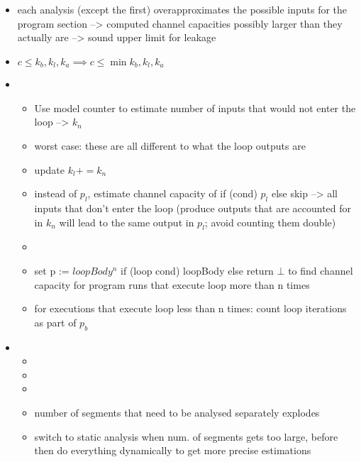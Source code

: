 \begin{itemize}
    \item each analysis (except the first) overapproximates the possible inputs for the program section --> computed channel capacities possibly larger than they actually are --> sound upper limit for leakage
    \item $c \leq k_b, k_l, k_a \implies c \leq \min{k_b, k_l, k_a}$
    \item {}
    \begin{itemize}
        \item Use model counter to estimate number of inputs that would not enter the loop --> $k_n$
        \item worst case: these are all different to what the loop outputs are
        \item update $k_l += k_n$
        \item instead of $p_l$, estimate channel capacity of if (cond) $p_l$ else skip --> all inputs that don't enter the loop (produce outputs that are accounted for in $k_n$ will lead to the same output in $p_l$; avoid counting them double)
        \item {}
        \item set p := $loopBody^n$ if (loop cond) loopBody else return $\bot$ to find channel capacity for program runs that execute loop more than n times
        \item for executions that execute loop less than n times: count loop iterations as part of $p_b$
    \end{itemize}
    \item {}
        \begin{itemize}
        \item {}
        \item {}
        \item {}
        \item number of segments that need to be analysed separately explodes
        \item switch to static analysis when num. of segments gets too large, before then do everything dynamically to get more precise estimations

\end{itemize}
\end{itemize}
